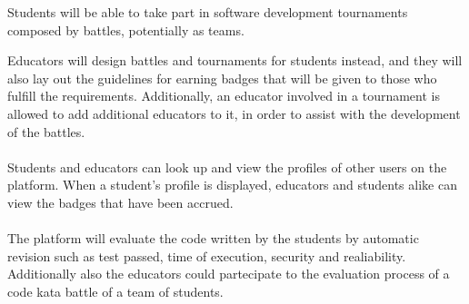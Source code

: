 Students will be able to take part in software development tournaments composed by battles, potentially as teams.

Educators will design battles and tournaments for students instead, and they will also lay out the guidelines for earning badges that will be given to those who fulfill the requirements. Additionally, an educator involved in a tournament is 
allowed to add additional educators to it, in order to assist with the development of the battles.\\
\\
Students and educators can look up and view the profiles of other users on the platform. When a student's profile is displayed, educators and students alike can view the badges that have been accrued.\\
\\
The platform will evaluate the code written by the students by automatic revision such as test passed, time of execution, security and realiability. Additionally also the educators could partecipate to the evaluation process of a code
kata battle of a team of students.\\

\newpage

